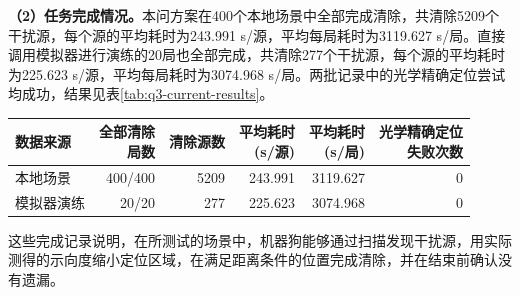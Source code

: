 \par\medskip{}
\textbf{（2）任务完成情况。}本问方案在400个本地场景中全部完成清除，共清除5209个干扰源，每个源的平均耗时为243.991 s/源，平均每局耗时为3119.627 s/局。直接调用模拟器进行演练的20局也全部完成，共清除277个干扰源，每个源的平均耗时为225.623 s/源，平均每局耗时为3074.968 s/局。两批记录中的光学精确定位尝试均成功，结果见表\ref{tab:q3-current-results}。

\Needspace{40mm}
\begin{center}
\begin{minipage}{\linewidth}
\centering\small
{}
\label{tab:q3-current-results}
\vspace{4pt}
\begin{tabularx}{\linewidth}{@{}Xrrrrr@{}}
\toprule
数据来源 & \shortstack{全部清除\\局数} & 清除源数 & \shortstack{平均耗时\\(s/源)} & \shortstack{平均耗时\\(s/局)} & \shortstack{光学精确定位\\失败次数} \\
\midrule
本地场景 & 400/400 & 5209 & 243.991 & 3119.627 & 0 \\
模拟器演练 & 20/20 & 277 & 225.623 & 3074.968 & 0 \\
\bottomrule
\end{tabularx}
\end{minipage}
\end{center}

这些完成记录说明，在所测试的场景中，机器狗能够通过扫描发现干扰源，用实际测得的示向度缩小定位区域，在满足距离条件的位置完成清除，并在结束前确认没有遗漏。

